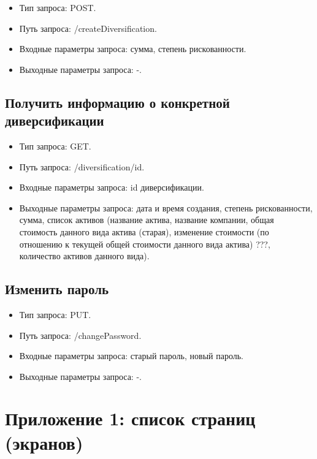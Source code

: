 \documentclass[a4paper, 14pt]{article}
\begin{document}
\begin{itemize}
    \item Тип запроса: POST.
    \item Путь запроса: /createDiversification.
    \item Входные параметры запроса: сумма, степень рискованности.
    \item Выходные параметры запроса: -.
\end{itemize}

\subsection{Получить информацию о конкретной диверсификации}

\begin{itemize}
    \item Тип запроса: GET.
    \item Путь запроса: /diversification/{id}.
    \item Входные параметры запроса: id диверсификации.
    \item Выходные параметры запроса: дата и время создания, степень рискованности, сумма, список активов (название актива, название компании, общая стоимость данного вида актива (старая), изменение стоимости (по отношению к текущей общей стоимости данного вида актива) ???, количество активов данного вида).
\end{itemize}

\subsection{Изменить пароль}

\begin{itemize}
    \item Тип запроса: PUT.
    \item Путь запроса: /changePassword.
    \item Входные параметры запроса: старый пароль, новый пароль.
    \item Выходные параметры запроса: -.
\end{itemize}

\newpage
\section{Приложение 1: список страниц (экранов)}
\end{document}
